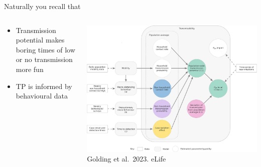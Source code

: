 \documentclass[
  ignorenonframetext,
]{beamer}
\providecommand{\tightlist}{%
  \setlength{\itemsep}{0pt}\setlength{\parskip}{0pt}}\usepackage{longtable,booktabs,array}
\begin{document}
\begin{frame}{Naturally you recall that}
\label{naturally-you-recall-that-1}
\begin{columns}[T]
\begin{column}{0.4\textwidth}
\begin{itemize}
\tightlist
\item
  Transmission potential makes boring times of low or no transmission
  more fun
\item
  TP is informed by behavioural data
\end{itemize}
\end{column}

\begin{column}{0.7\textwidth}
\includegraphics{images/tp_model_schema.jpg} Golding et al.~2023. eLife
\end{column}
\end{columns}
\end{frame}
\end{document}
